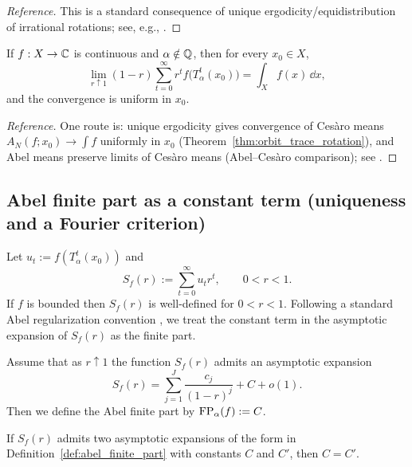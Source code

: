 \begin{proof}[Reference]
This is a standard consequence of unique ergodicity/equidistribution of irrational rotations; see, e.g., \cite{Weyl1916,KuipersNiederreiter1974,Walters1982}.
\end{proof}

\begin{theorem}
\label{thm:abel_mean_rotation}
If $f:X\to\mathbb{C}$ is continuous and $\alpha\notin\mathbb{Q}$, then for every $x_0\in X$,
\[
\lim_{r\uparrow 1} (1-r)\sum_{t=0}^{\infty} r^t f\bigl(T_\alpha^t(x_0)\bigr)
=\int_X f(x)\,\dd x,
\]
and the convergence is uniform in $x_0$.
\end{theorem}

\begin{proof}[Reference]
One route is: unique ergodicity gives convergence of Ces\`aro means $A_N(f;x_0)\to\int f$ uniformly in $x_0$ (Theorem~\ref{thm:orbit_trace_rotation}), and Abel means preserve limits of Ces\`aro means (Abel--Ces\`aro comparison); see \cite{Hardy1949,Walters1982}.
\end{proof}

\subsection{Abel finite part as a constant term (uniqueness and a Fourier criterion)}
\label{app:abel_finite_part}

Let $u_t:=f(T_\alpha^t(x_0))$ and
\[
S_f(r):=\sum_{t=0}^{\infty} u_t r^t,\qquad 0<r<1.
\]
If $f$ is bounded then $S_f(r)$ is well-defined for $0<r<1$.
Following a standard Abel regularization convention \cite{Hardy1949}, we treat the constant term in the asymptotic expansion of $S_f(r)$ as the finite part.

\begin{definition}
\label{def:abel_finite_part}
Assume that as $r\uparrow 1$ the function $S_f(r)$ admits an asymptotic expansion
\[
S_f(r)=\sum_{j=1}^{J}\frac{c_j}{(1-r)^j} + C + o(1).
\]
Then we define the Abel finite part by $\mathrm{FP}_{\alpha}(f):=C$.
\end{definition}

\begin{lemma}
\label{lem:fp_unique_rgs}
If $S_f(r)$ admits two asymptotic expansions of the form in Definition~\ref{def:abel_finite_part} with constants $C$ and $C'$, then $C=C'$.
\end{lemma}

